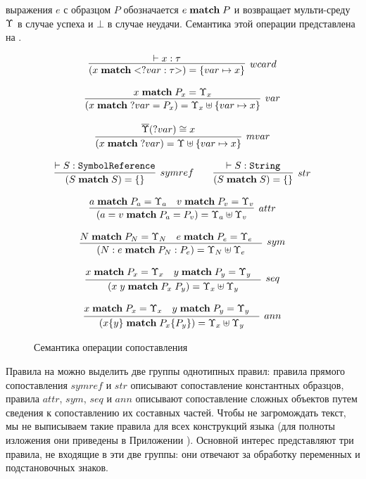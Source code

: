  выражения $e$ с образцом $P$ обозначается
$e \; \mathbf{match} \; P$ и возвращает мульти-среду $\Upsilon$ в случае успеха и $\bot$ в случае неудачи. Семантика этой операции представлена на .
\begin{figure}[htbp]
$$
\begin{array}{c}
\infer[wcard]{
	(\match{x}{\wcard{?var}{\tau}}) = \meitem{var}{x}
}{\vdash x : \tau}
%
\\
\,\\
%
\infer[var]{
	(\match{x}{?var = P_x}) = \ME_x \mejoin \meitem{var}{x}
}{
\match{x}{P_x} = \ME_x
}
%
\\
\,\\
%
\infer[mvar]{
	(\match{x}{?var}) = \ME \mejoin \meitem{var}{x}
}{
\meflatten{\ME}(?var) \cong x
}
%
\\
\,\\
%
\infer[symref]{(\match{S}{S}) = \meempty}{\vdash S : \mathtt{SymbolReference}}
\qquad
\infer[str]{(\match{S}{S}) = \meempty}{\vdash S : \mathtt{String}}
%
\\
\,\\
%
\infer[attr]{
	(\match{a = v}{P_a = P_v}) = \ME_a \mejoin \ME_v
}{
\match{a}{P_a} = \ME_a &
\match{v}{P_v} = \ME_v
}
%
\\
\,\\
%
\infer[sym]{
	(\match{N : e}{P_N : P_e}) = \ME_N \mejoin \ME_e
}{
\match{N}{P_N} = \ME_N &
\match{e}{P_e} = \ME_e &
}
%
\\
\,\\
%
\infer[seq]{
	(\match{x \; y}{P_x \; P_y}) = \ME_x \mejoin \ME_y
}{
	\match{x}{P_x} = \ME_x &
	\match{y}{P_y} = \ME_y &
}
%
\\
\,\\
%
\infer[ann]{
	(\match{x \{y\}}{P_x \{P_y\}}) = \ME_x \mejoin \ME_y
}{
	\match{x}{P_x} = \ME_x &
	\match{y}{P_y} = \ME_y &
}
\end{array}
$$
	\centering
	\caption{Семантика операции сопоставления}\label{MatchSem}
\end{figure}
\newcommand{\ruleref}[1]{$#1$}

Правила на  можно выделить две группы однотипных правил: правила прямого сопоставления \ruleref{symref} и \ruleref{str} описывают сопоставление константных образцов, правила \ruleref{attr}, \ruleref{sym}, \ruleref{seq} и \ruleref{ann} описывают сопоставление сложных объектов путем сведения к сопоставлению их составных частей. Чтобы не загромождать текст, мы не выписываем такие правила для всех конструкций языка (для полноты изложения они приведены в Приложении ). Основной интерес представляют три правила, не входящие в эти две группы: они отвечают за обработку переменных и подстановочных знаков.

